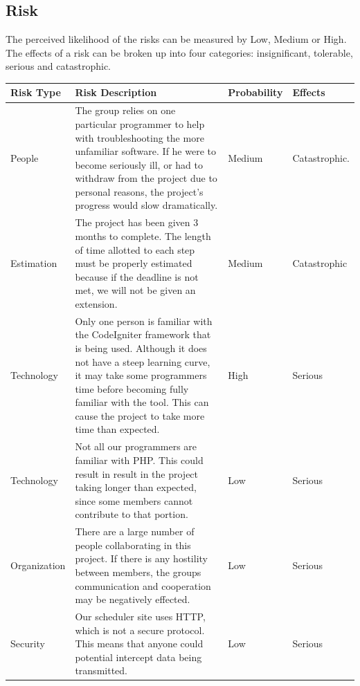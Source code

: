 \documentclass[12pt]{article}
\begin{document}
\subsection{Risk} 
The perceived likelihood of the risks can be measured by Low, Medium or High. The effects of a risk can be broken up into four categories: insignificant, tolerable, serious and catastrophic.

\begin{center}
\begin{longtable}{| p{2cm} | p{9cm} | p{2cm} | p{2cm} |}
\hline
\textbf{Risk Type}	&  \centering \textbf{Risk Description} & \textbf{Probability} & \textbf{Effects} \\ \hline \hline
People          & The group relies on one particular programmer to help with troubleshooting the more unfamiliar software. If he were to become seriously ill, or had to withdraw from the project due to personal reasons, the project's progress would slow dramatically.   & Medium & Catastrophic.    \\ \hline
Estimation  & The project has been given 3 months to complete. The length of time allotted to each step must be properly estimated because if the deadline is not met, we will not be given an extension. & Medium & Catastrophic \\ \hline

Technology		& Only one person is familiar with the CodeIgniter framework that is being used. Although it does not have a steep learning curve, it may take some programmers  time before becoming fully familiar with the tool. This can cause the project to take more time than expected. & High & Serious \\ \hline	 
Technology		& Not all our programmers are familiar with PHP. This could result in result in the project taking longer than expected, since some members cannot contribute to that portion. & Low & Serious \\ 	\hline	
Organization  & There are a large number of people collaborating in this project. If there is any hostility between members, the groups communication and cooperation may be negatively effected. & Low & Serious \\ \hline
Security		&  Our scheduler site uses HTTP, which is not a secure protocol. This means that anyone could potential intercept data being transmitted. & Low & Serious \\ \hline


\end{longtable}
\end{center}
\end{document}
